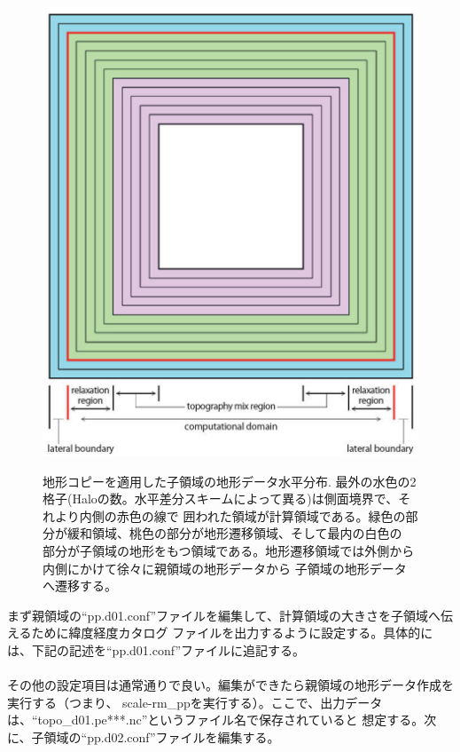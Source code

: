 \begin{figure}[tb]
\begin{center}
  \includegraphics[width=0.4\hsize]{./figure/topo_copy.eps}\\
  \caption{地形コピーを適用した子領域の地形データ水平分布. 最外の水色の2格子(Haloの数。水平差分スキームによって異る)は側面境界で、それより内側の赤色の線で
           囲われた領域が計算領域である。緑色の部分が緩和領域、桃色の部分が地形遷移領域、そして最内の白色の
           部分が子領域の地形をもつ領域である。地形遷移領域では外側から内側にかけて徐々に親領域の地形データから
           子領域の地形データへ遷移する。}
  \label{fig_topocopy}
\end{center}
\end{figure}

まず親領域の``pp.d01.conf''ファイルを編集して、計算領域の大きさを子領域へ伝えるために緯度経度カタログ
ファイルを出力するように設定する。具体的には、下記の記述を``pp.d01.conf''ファイルに追記する。\\

\\

\noindent その他の設定項目は通常通りで良い。編集ができたら親領域の地形データ作成を実行する（つまり、
scale-rm\_ppを実行する）。ここで、出力データは、``topo\_d01.pe***.nc''というファイル名で保存されていると
想定する。次に、子領域の``pp.d02.conf''ファイルを編集する。\\

